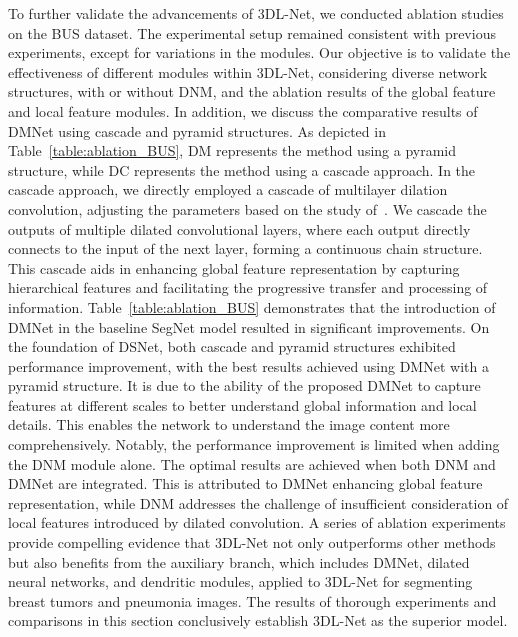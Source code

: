 \documentclass[review]{elsarticle}
\begin{document}
	To further validate the advancements of 3DL-Net, we conducted ablation studies on the BUS dataset. The experimental setup remained consistent with previous experiments, except for variations in the modules. Our objective is to validate the effectiveness of different modules within 3DL-Net, considering diverse network structures, with or without DNM, and the ablation results of the global feature and local feature modules. In addition, we discuss the comparative results of DMNet using cascade and pyramid structures. As depicted in Table~\ref{table:ablation_BUS}, DM represents the method using a pyramid structure, while DC represents the method using a cascade approach. In the cascade approach, we directly employed a cascade of multilayer dilation convolution, adjusting the parameters based on the study of~\cite{wang2018understanding,chen2023rrcnet}. We cascade the outputs of multiple dilated convolutional layers, where each output directly connects to the input of the next layer, forming a continuous chain structure. This cascade aids in enhancing global feature representation by capturing hierarchical features and facilitating the progressive transfer and processing of information. Table~\ref{table:ablation_BUS} demonstrates that the introduction of DMNet in the baseline SegNet model resulted in significant improvements. On the foundation of DSNet, both cascade and pyramid structures exhibited performance improvement, with the best results achieved using DMNet with a pyramid structure. It is due to the ability of the proposed DMNet to capture features at different scales to better understand global information and local details. This enables the network to understand the image content more comprehensively. Notably, the performance improvement is limited when adding the DNM module alone. The optimal results are achieved when both DNM and DMNet are integrated. This is attributed to DMNet enhancing global feature representation, while DNM addresses the challenge of insufficient consideration of local features introduced by dilated convolution. A series of ablation experiments provide compelling evidence that 3DL-Net not only outperforms other methods but also benefits from the auxiliary branch, which includes DMNet, dilated neural networks, and dendritic modules, applied to 3DL-Net for segmenting breast tumors and pneumonia images. The results of thorough experiments and comparisons in this section conclusively establish 3DL-Net as the superior model.
	
\end{document}
